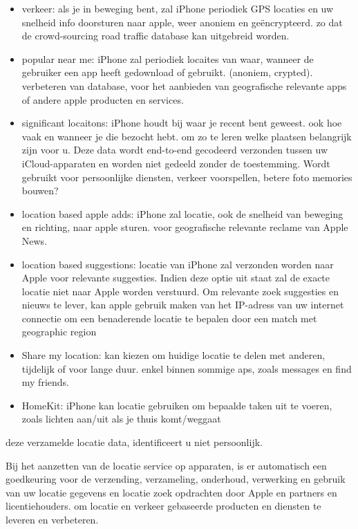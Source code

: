 \begin{itemize}
\item verkeer: als je in beweging bent, zal iPhone periodiek GPS locaties en uw snelheid info doorsturen naar apple, weer anoniem en geëncrypteerd. zo dat de crowd-sourcing road traffic database kan uitgebreid worden.

\item popular near me: iPhone zal periodiek locaites van waar, wanneer de gebruiker een app heeft gedownload of gebruikt. (anoniem, crypted). verbeteren van database, voor het aanbieden van geografische relevante apps of andere apple producten en services.

\item significant locaitons: iPhone houdt bij waar je recent bent geweest. ook hoe vaak en wanneer je die bezocht hebt. om zo te leren welke plaatsen belangrijk zijn voor u. Deze data wordt end-to-end gecodeerd verzonden tussen uw iCloud-apparaten en worden niet gedeeld zonder de toestemming. Wordt gebruikt voor persoonlijke diensten, verkeer voorspellen, betere foto memories bouwen?

\item location based apple adds: iPhone zal locatie, ook de snelheid van beweging en richting, naar apple sturen. voor geografische relevante reclame van Apple News.

\item location based suggestions: locatie van iPhone zal verzonden worden naar Apple voor relevante suggesties. Indien deze optie uit staat zal de exacte locatie niet naar Apple worden verstuurd. Om relevante zoek suggesties en nieuws te lever, kan apple gebruik maken van het IP-adress van uw internet connectie om een benaderende locatie te bepalen door een match met geographic region

\item Share my location: kan kiezen om huidige locatie te delen met anderen, tijdelijk of voor lange duur. enkel binnen sommige aps, zoals messages en find my friends.

\item HomeKit: iPhone kan locatie gebruiken om bepaalde taken uit te voeren, zoals lichten aan/uit als je thuis komt/weggaat

\end{itemize}

deze verzamelde locatie data, identificeert u niet persoonlijk.


Bij het aanzetten van de locatie service op apparaten, is er automatisch een goedkeuring voor de verzending, verzameling, onderhoud, verwerking en gebruik van uw locatie gegevens en locatie zoek opdrachten door Apple en partners en licentiehouders. om locatie en verkeer gebaseerde producten en diensten te leveren en verbeteren.

